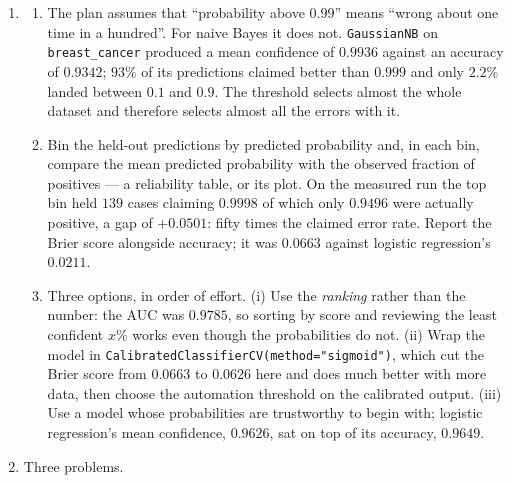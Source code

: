 \documentclass[11pt]{article}
\begin{document}
\begin{enumerate}[leftmargin=*, itemsep=0.7em]
\item
  \begin{enumerate}[label=(\alph*)]
    \item The plan assumes that ``probability above $0.99$'' means ``wrong
      about one time in a hundred''. For naive Bayes it does not.
      \texttt{GaussianNB} on \texttt{breast\_cancer} produced a mean
      confidence of $0.9936$ against an accuracy of $0.9342$; $93\%$ of its
      predictions claimed better than $0.999$ and only $2.2\%$ landed between
      $0.1$ and $0.9$. The threshold selects almost the whole dataset and
      therefore selects almost all the errors with it.
    \item Bin the held-out predictions by predicted probability and, in each
      bin, compare the mean predicted probability with the observed fraction
      of positives --- a reliability table, or its plot. On the measured run
      the top bin held $139$ cases claiming $0.9998$ of which only $0.9496$
      were actually positive, a gap of $+0.0501$: fifty times the claimed
      error rate. Report the Brier score alongside accuracy; it was $0.0663$
      against logistic regression's $0.0211$.
    \item Three options, in order of effort. (i) Use the \emph{ranking}
      rather than the number: the AUC was $0.9785$, so sorting by score and
      reviewing the least confident $x\%$ works even though the probabilities
      do not. (ii) Wrap the model in
      \texttt{CalibratedClassifierCV(method="sigmoid")}, which cut the Brier
      score from $0.0663$ to $0.0626$ here and does much better with more
      data, then choose the automation threshold on the calibrated output.
      (iii) Use a model whose probabilities are trustworthy to begin with;
      logistic regression's mean confidence, $0.9626$, sat on top of its
      accuracy, $0.9649$.
  \end{enumerate}

\item Three problems.


\end{enumerate}
\end{document}
